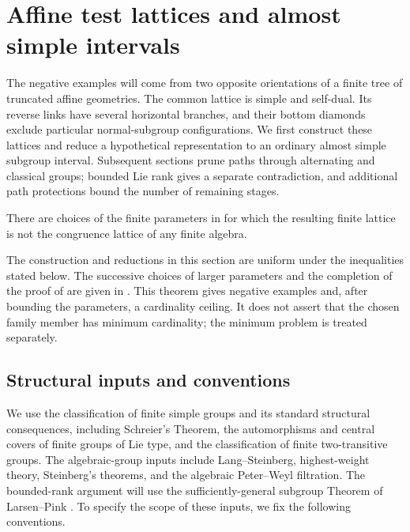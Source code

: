 \section{Affine test lattices and almost simple intervals}\label{sec:affine}

The negative examples will come from two opposite orientations of a finite
tree of truncated affine geometries. The common lattice is simple and
self-dual. Its reverse links have several horizontal branches, and their
bottom diamonds exclude particular normal-subgroup configurations. We first
construct these lattices and reduce a hypothetical representation to an
ordinary almost simple subgroup interval. Subsequent sections prune paths
through alternating and classical groups; bounded Lie rank gives a separate
contradiction, and additional path protections bound the number of remaining
stages.

\begin{theorem}\label{f:negative-family}
There are choices of the finite parameters in  for
which the resulting finite lattice is not the congruence lattice of any
finite algebra.
\end{theorem}

The construction and reductions in this section are uniform under the
inequalities stated below. The successive choices of larger parameters and
the completion of the proof of  are given in
.
This theorem gives negative examples and, after bounding the parameters, a
cardinality ceiling. It does not assert that the chosen family member has
minimum cardinality; the minimum problem is treated separately.

\subsection{Structural inputs and conventions}

We use the classification of finite simple groups and its standard
structural consequences, including Schreier's Theorem, the automorphisms
and central covers of finite groups of Lie type, and the classification of
finite two-transitive groups. The algebraic-group inputs include
Lang--Steinberg, highest-weight theory, Steinberg's theorems, and the
algebraic Peter--Weyl filtration. The bounded-rank argument will use the
sufficiently-general subgroup Theorem of Larsen--Pink
\cite{LarsenPink2011}. To specify the scope of these inputs, we fix the
following conventions.

